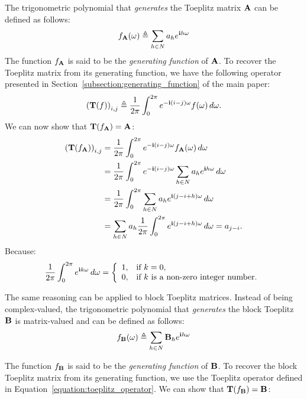 The trigonometric polynomial that \emph{generates} the Toeplitz matrix $\mathbf{A}$ can be defined as follows:
\begin{equation}
    f_{\mathbf{A}}(\omega) \triangleq \sum_{h \in N} a_h e^{\mathbf{i} h \omega}
\end{equation}
The function $f_{\mathbf{A}}$ is said to be the \emph{generating function} of $\mathbf{A}$. To recover the Toeplitz matrix from its generating function, we have the following operator presented in Section~\ref{subsection:generating_function} of the main paper:
\begin{equation} \label{equation:toeplitz_operator}
    \leftmat \Tmat(f) \rightmat_{i, j} \triangleq  \frac{1}{2\pi} \int_0^{2\pi} e^{-\ci (i - j)\omega} f(\omega) \,d\omega .
\end{equation}
We can now show that $\mathbf{T}(f_{\mathbf{A}}) = \mathbf{A}$: 
\begingroup
\allowdisplaybreaks
\begin{align}
    \leftmat \Tmat(f_\Amat) \rightmat_{i, j} &= \frac{1}{2\pi} \int_0^{2\pi} e^{-\ci (i-j)\omega} f_{\Amat}(\omega) \,d\omega  \\
    &= \frac{1}{2\pi} \int_0^{2\pi} e^{-\ci (i-j) \omega} \sum_{h \in N} a_h e^{\ci h \omega} \,d\omega  \\
    &= \frac{1}{2\pi} \int_0^{2\pi} \sum_{h \in N} a_h e^{\ci (j - i + h) \omega} \,d\omega  \\
    &= \sum_{h \in N} a_h \frac{1}{2\pi} \int_0^{2\pi} e^{\ci (j - i + h) \omega} \,d\omega 
    = a_{j-i} .
\end{align}
\endgroup
Because:
\begin{equation}
    \frac{1}{2\pi} \int_0^{2\pi} e^{\ci k \omega} \,d\omega = \left\{
                \begin{array}{ll}
                  1, & \text{if}\ k = 0, \\
                  0, & \text{if}\ k\ \text{is a non-zero integer number.}
                \end{array}
                \right.
\end{equation}

The same reasoning can be applied to block Toeplitz matrices. Instead of being complex-valued, the trigonometric polynomial that {\em generates} the block Toeplitz $\mathbf{B}$ is matrix-valued and can be defined as follows:
\begin{equation}
    f_{\mathbf{B}}(\omega) \triangleq \sum_{h \in N} \mathbf{B}_h e^{\mathbf{i} h \omega}
\end{equation}

The function $f_{\mathbf{B}}$ is said to be the \emph{generating function} of $\mathbf{B}$. To recover the block Toeplitz matrix from its generating function, we use the Toeplitz operator defined in Equation~\ref{equation:toeplitz_operator}. We can show that $\mathbf{T}(f_\mathbf{B}) = \mathbf{B}$:

